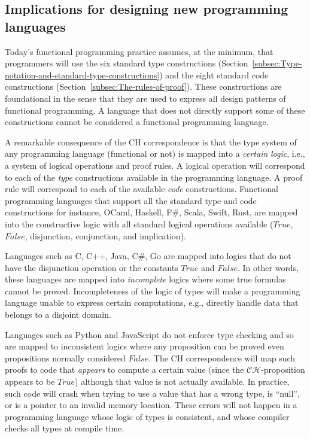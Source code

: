 \subsection{Implications for designing new programming languages}

Today\textsf{'}s functional programming practice assumes, at the minimum, that
programmers will use the six standard type constructions (Section~\ref{subsec:Type-notation-and-standard-type-constructions})
and the eight standard code constructions (Section~\ref{subsec:The-rules-of-proof}).
These constructions are foundational in the sense that they are used
to express all design patterns of functional programming. A language
that does not directly support some of these constructions cannot
be considered a functional programming language.

A remarkable consequence of the CH correspondence is that the type
system of any programming language (functional or not) is mapped into
a \emph{certain} \emph{logic}, i.e., a system of logical operations
and proof rules. A logical operation will correspond to each of the
\emph{type} constructions available in the programming language. A
proof rule will correspond to each of the available \emph{code} constructions.
Functional programming languages that support all the standard type
and code constructions \textemdash{} for instance, OCaml, Haskell,
F\#, Scala, Swift, Rust, \textemdash{} are mapped into the constructive
logic with all standard logical operations available ($True$, $False$,
disjunction, conjunction, and implication).

Languages such as C, C++, Java, C\#, Go are mapped into logics that
do not have the disjunction operation or the constants $True$ and
$False$. In other words, these languages are mapped into \emph{incomplete}
logics where some true formulas cannot be proved. Incompleteness of
the logic of types will make a programming language unable to express
certain computations, e.g., directly handle data that belongs to a
disjoint domain. 

Languages such as Python and JavaScript do not enforce type checking
and so are mapped to inconsistent logics where any proposition can
be proved \textemdash{} even propositions normally considered $False$.
The CH correspondence will map such proofs to code that \emph{appears}
to compute a certain value (since the $\mathcal{CH}$-proposition
appears to be $True$) although that value is not actually available.
In practice, such code will crash when trying to use a value that
has a wrong type, is \textsf{``}null\textsf{''}, or is a pointer to an invalid memory
location. These errors will not happen in a programming language whose
logic of types is consistent, and whose compiler checks all types
at compile time. 

